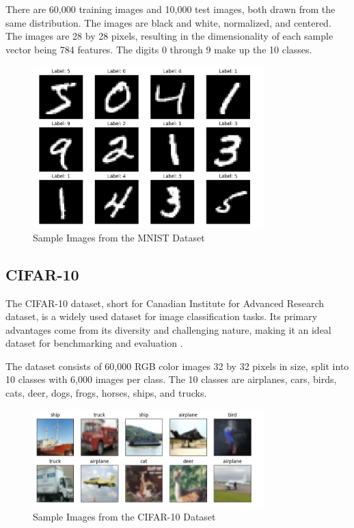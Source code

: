 \documentclass[12pt]{article}
\begin{document}
There are 60,000 training images and 10,000 test images, both drawn from the same distribution. The images are black and white, normalized, and centered. The images are 28 by 28 pixels, resulting in the dimensionality of each sample vector being 784 features. The digits 0 through 9 make up the 10 classes. 

\begin{figure}[H]
    \centering
    \includegraphics[width=0.8\textwidth]{images/mnist_images.png}
    \caption{Sample Images from the MNIST Dataset}
    \label{fig:mnist_dataset}
\end{figure}

\subsection{CIFAR-10}

The CIFAR-10 dataset, short for Canadian Institute for Advanced Research dataset, is a widely used dataset for image classification tasks. Its primary advantages come from its diversity and challenging nature, making it an ideal dataset for benchmarking and evaluation \cite{krizhevsky2009}.

The dataset consists of 60,000 RGB color images 32 by 32 pixels in size, split into 10 classes with 6,000 images per class. The 10 classes are airplanes, cars, birds, cats, deer, dogs, frogs, horses, ships, and trucks. 

\begin{figure}[H]
    \centering
    \includegraphics[width=0.8\textwidth]{images/cifar10_images.png}
    \caption{Sample Images from the CIFAR-10 Dataset}
    \label{fig:cifar10_dataset}
\end{figure}
\end{document}
